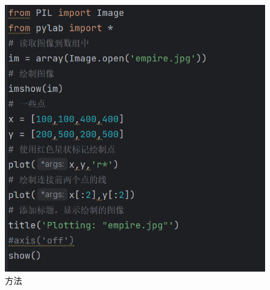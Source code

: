 \documentclass{ctexart}
\begin{document}
	\begin{figure}[H]
		\centering
		\includegraphics[scale=0.50]{3.92}
		\caption{方法}
	\end{figure}
	
\end{document}

